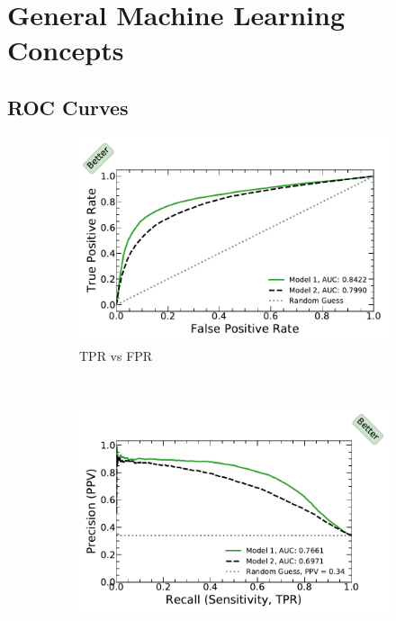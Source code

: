 \section{General Machine Learning Concepts}
\label{additional:ml:general}

\subsection{ROC Curves}
\label{additional:ml:general:eval:ROC}

\begin{figure}[H]
\centering
  \begin{subfigure}[c]{0.48\textwidth}\centering
  \includegraphics[width=\textwidth,trim={0.18cm 0.3cm 0.18cm 0.3cm},clip]{figures/ml/roc_curves/roc.pdf}%
  \caption{TPR vs FPR}
  \label{fig:ml:roc:standard}
  \end{subfigure}
  ~
  \begin{subfigure}[c]{0.48\textwidth}\centering
  \includegraphics[width=\textwidth,trim={0.18cm 0.3cm 0.18cm 0.3cm},clip]{figures/ml/roc_curves/roc_precision_recall.pdf}%

\end{subfigure}
\end{figure}
